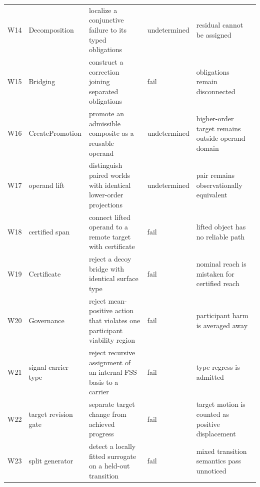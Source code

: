 \begin{longtable}{p{}p{}p{}p{}p{}}
W14 & Decomposition & localize a conjunctive failure to its typed obligations & undetermined & residual cannot be assigned \\
W15 & Bridging & construct a correction joining separated obligations & fail & obligations remain disconnected \\
W16 & CreatePromotion & promote an admissible composite as a reusable operand & undetermined & higher-order target remains outside operand domain \\
W17 & operand lift & distinguish paired worlds with identical lower-order projections & undetermined & pair remains observationally equivalent \\
W18 & certified span & connect lifted operand to a remote target with certificate & fail & lifted object has no reliable path \\
W19 & Certificate & reject a decoy bridge with identical surface type & fail & nominal reach is mistaken for certified reach \\
W20 & Governance & reject mean-positive action that violates one participant viability region & fail & participant harm is averaged away \\
W21 & signal carrier type & reject recursive assignment of an internal FSS basis to a carrier & fail & type regress is admitted \\
W22 & target revision gate & separate target change from achieved progress & fail & target motion is counted as positive displacement \\
W23 & split generator & detect a locally fitted surrogate on a held-out transition & fail & mixed transition semantics pass unnoticed \\
\bottomrule
\end{longtable}

